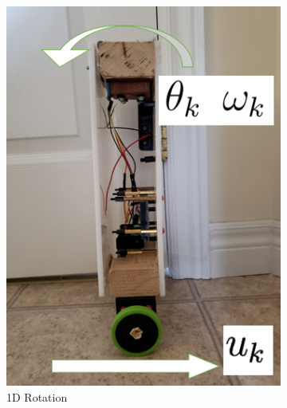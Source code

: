 \documentclass[12pt]{article}
\begin{document}
\begin{figure}
\begin{subfigure}{0.3\textwidth}
\includegraphics[width=\linewidth]{./figures/one_d_rotation.png}
\caption{1D Rotation} \label{fig_one_d_rotation}
\end{subfigure}
\hspace*{\fill} %
\begin{subfigure}{0.3\textwidth}

\end{subfigure}
\end{figure}
\end{document}
